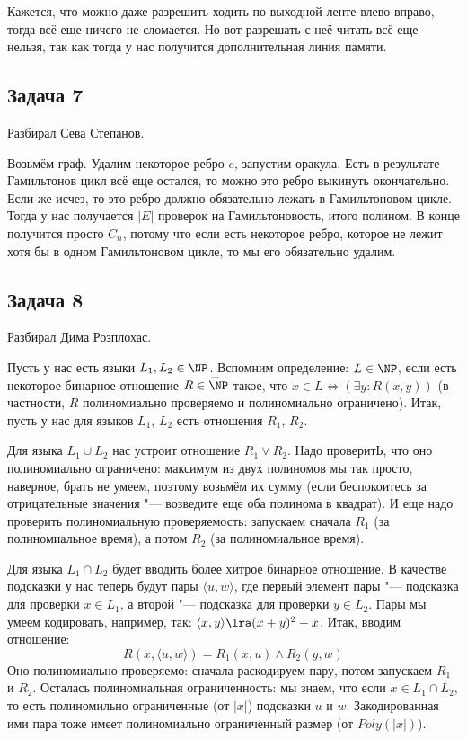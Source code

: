 	\begin{Rem}
		Кажется, что можно даже разрешить ходить по выходной ленте влево-вправо, тогда
		всё еще ничего не сломается.
		Но вот разрешать с неё читать всё еще нельзя, так как тогда у нас получится дополнительная линия памяти.
	\end{Rem}

\subsection{Задача 7}
	Разбирал Сева Степанов.

	Возьмём граф.
	Удалим некоторое ребро $e$, запустим оракула.
	Есть в результате Гамильтонов цикл всё еще остался, то можно это ребро выкинуть окончательно.
	Если же исчез, то это ребро должно обязательно лежать в Гамильтоновом цикле.
	Тогда у нас получается $|E|$ проверок на Гамильтоновость, итого полином.
	В конце получится просто $C_n$, потому что если есть некоторое ребро, которое не лежит хотя
	бы в одном Гамильтоновом цикле, то мы его обязательно удалим.

\subsection{Задача 8}
	Разбирал Дима Розплохас.

	Пусть у нас есть языки $L_1, L_2 \in \NP$.
	Вспомним определение: $L \in \NP$, если есть некоторое бинарное отношение $R \in \widetilde{\NP}$
	такое, что $x \in L \iff (\exists y \colon R(x, y))$ (в частности, $R$ полиномиально проверяемо
	и полиномиально ограничено).
	Итак, пусть у нас для языков $L_1$, $L_2$ есть отношения $R_1$, $R_2$.

	Для языка $L_1 \cup L_2$ нас устроит отношение $R_1 \lor R_2$.
	Надо проверитЬ, что оно полиномиально ограничено: максимум из двух полиномов мы так просто, наверное, брать не умеем,
	поэтому возьмём их сумму (если беспокоитесь за отрицательные значения "--- возведите еще оба полинома в квадрат).
	И еще надо проверить полиномиальную проверяемость: запускаем сначала $R_1$ (за полиномиальное время),
	а потом $R_2$ (за полиномиальное время).

	Для языка $L_1 \cap L_2$ будет вводить более хитрое бинарное отношение.
	В качестве подсказки у нас теперь будут пары $\langle u, w \rangle$,
	где первый элемент пары "--- подсказка для проверки $x \in L_1$,
	а второй "--- подсказка для проверки $y \in L_2$.
	Пары мы умеем кодировать, например, так: $\langle x, y \rangle \lra (x+y)^2+x$.
	Итак, вводим отношение:
	\[ R(x, \langle u, w \rangle) = R_1(x, u) \land R_2(y, w) \]
	Оно полиномиально проверяемо: сначала раскодируем пару, потом запускаем $R_1$ и $R_2$.
	Осталась полиномиальная ограниченность: мы знаем, что если $x \in L_1 \cap L_2$,
	то есть полиномильно ограниченные (от $|x|$) подсказки $u$ и $w$.
	Закодированная ими пара тоже имеет полиномиально ограниченный размер (от $Poly(|x|)$).

